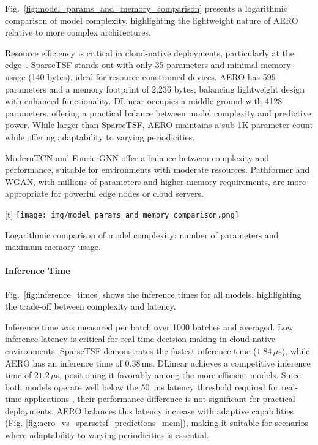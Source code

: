 \documentclass{ieeetmlcn}
\begin{document}
Fig.~\ref{fig:model_params_and_memory_comparison} presents a logarithmic comparison of model complexity, highlighting the lightweight nature of AERO relative to more complex architectures.

Resource efficiency is critical in cloud-native deployments, particularly at the edge~\cite{waleffe2023mariusgnn}. SparseTSF stands out with only 35 parameters and minimal memory usage (140 bytes), ideal for resource-constrained devices. AERO has 599 parameters and a memory footprint of 2,236 bytes, balancing lightweight design with enhanced functionality. {\color{blue} DLinear occupies a middle ground with 4128 parameters, offering a practical balance between model complexity and predictive power.} While larger than SparseTSF, AERO maintains a sub-1K parameter count while offering adaptability to varying periodicities.

ModernTCN and FourierGNN offer a balance between complexity and performance, suitable for environments with moderate resources. Pathformer and WGAN, with millions of parameters and higher memory requirements, are more appropriate for powerful edge nodes or cloud servers.


\par\medskip\begin{center}[t]
\centering
\texttt{[image: img/model\_params\_and\_memory\_comparison.png]}
\caption{Logarithmic comparison of model complexity: number of parameters and maximum memory usage.}
\label{fig:model_params_and_memory_comparison}\end{center}\medskip\par

\paragraph*{Inference Time}

Fig.~\ref{fig:inference_times} shows the inference times for all models, highlighting the trade-off between complexity and latency.

Inference time was measured per batch over 1000 batches and averaged. Low inference latency is critical for real-time decision-making in cloud-native environments. SparseTSF demonstrates the fastest inference time ($1.84\,\mu$s), while AERO has an inference time of $0.38$\,ms. {\color{blue} DLinear achieves a competitive inference time of $21.2\,\mu$s, positioning it favorably among the more efficient models.} Since both models operate well below the \SI{50}{\milli\second} latency threshold required for real-time applications \cite{50mslatency}, their performance difference is not significant for practical deployments. AERO balances this latency increase with adaptive capabilities (Fig. \ref{fig:aero_vs_sparsetsf_predictions_mem}), making it suitable for scenarios where adaptability to varying periodicities is essential.
\end{document}
